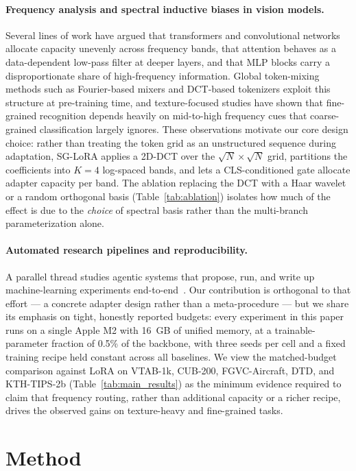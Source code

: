 \documentclass{article}
\begin{document}
\paragraph{Frequency analysis and spectral inductive biases in vision models.}
Several lines of work have argued that transformers and convolutional networks allocate capacity unevenly across frequency bands, that attention behaves as a data-dependent low-pass filter at deeper layers, and that MLP blocks carry a disproportionate share of high-frequency information. Global token-mixing methods such as Fourier-based mixers and DCT-based tokenizers exploit this structure at pre-training time, and texture-focused studies have shown that fine-grained recognition depends heavily on mid-to-high frequency cues that coarse-grained classification largely ignores. These observations motivate our core design choice: rather than treating the token grid as an unstructured sequence during adaptation, SG-LoRA applies a 2D-DCT over the $\sqrt{N}\times\sqrt{N}$ grid, partitions the coefficients into $K=4$ log-spaced bands, and lets a CLS-conditioned gate allocate adapter capacity per band. The ablation replacing the DCT with a Haar wavelet or a random orthogonal basis (Table~\ref{tab:ablation}) isolates how much of the effect is due to the \emph{choice} of spectral basis rather than the multi-branch parameterization alone.

\paragraph{Automated research pipelines and reproducibility.}
A parallel thread studies agentic systems that propose, run, and write up machine-learning experiments end-to-end~\citep{lu2024aiscientist, yamada2025aiscientistv2}. Our contribution is orthogonal to that effort — a concrete adapter design rather than a meta-procedure — but we share its emphasis on tight, honestly reported budgets: every experiment in this paper runs on a single Apple M2 with 16~GB of unified memory, at a trainable-parameter fraction of 0.5\% of the backbone, with three seeds per cell and a fixed training recipe held constant across all baselines. We view the matched-budget comparison against LoRA on VTAB-1k, CUB-200, FGVC-Aircraft, DTD, and KTH-TIPS-2b (Table~\ref{tab:main_results}) as the minimum evidence required to claim that frequency routing, rather than additional capacity or a richer recipe, drives the observed gains on texture-heavy and fine-grained tasks.

\section{Method}
\end{document}

